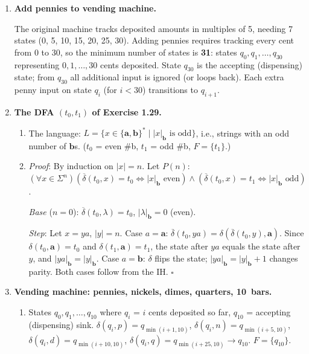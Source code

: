 \documentclass[11pt,openany]{book}
\def\cent{\text{\textcent}}
\def\DBAR{\ensuremath{\overline{\delta}}}
\begin{document}
\begin{enumerate}[{1.}1.]
\item \textbf{Add pennies to vending machine.}

The original machine tracks deposited amounts in multiples of 5\cent, needing 7 states (0, 5, 10, 15, 20, 25, 30\cent).
Adding pennies requires tracking every cent from 0 to 30, so the minimum number of states is \textbf{31}: states $q_0, q_1, \ldots, q_{30}$ representing $0, 1, \ldots, 30$ cents deposited.
State $q_{30}$ is the accepting (dispensing) state; from $q_{30}$ all additional input is ignored (or loops back).
Each extra penny input on state $q_i$ (for $i < 30$) transitions to $q_{i+1}$.

\item \textbf{The DFA $(t_0, t_1)$ of Exercise 1.29.}

\begin{enumerate}
\item The language: $L = \{x\in\{\mathbf{a},\mathbf{b}\}^* \mid |x|_\mathbf{b}\text{ is odd}\}$, i.e., strings with an odd number of $\mathbf{b}$s. ($t_0$ = even \#b, $t_1$ = odd \#b, $F=\{t_1\}$.)

\item \textit{Proof}: By induction on $|x|=n$. Let $P(n)$: $(\forall x\in\Sigma^n)(\DBAR(t_0,x)=t_0\Leftrightarrow|x|_\mathbf{b}\text{ even})\wedge(\DBAR(t_0,x)=t_1\Leftrightarrow|x|_\mathbf{b}\text{ odd})$.

\textit{Base} ($n=0$): $\DBAR(t_0,\lambda)=t_0$, $|\lambda|_\mathbf{b}=0$ (even). \checkmark

\textit{Step}: Let $x=ya$, $|y|=n$. Case $a=\mathbf{a}$: $\DBAR(t_0,ya)=\delta(\DBAR(t_0,y),\mathbf{a})$. Since $\delta(t_0,\mathbf{a})=t_0$ and $\delta(t_1,\mathbf{a})=t_1$, the state after $ya$ equals the state after $y$, and $|ya|_\mathbf{b}=|y|_\mathbf{b}$. Case $a=\mathbf{b}$: $\delta$ flips the state; $|ya|_\mathbf{b}=|y|_\mathbf{b}+1$ changes parity. Both cases follow from the IH. $\square$
\end{enumerate}

\item \textbf{Vending machine: pennies, nickels, dimes, quarters, 10\cent\ bars.}

\begin{enumerate}
\item States $q_0,q_1,\ldots,q_{10}$ where $q_i$ = $i$ cents deposited so far, $q_{10}$ = accepting (dispensing) sink. $\delta(q_i,p)=q_{\min(i+1,10)}$, $\delta(q_i,n)=q_{\min(i+5,10)}$, $\delta(q_i,d)=q_{\min(i+10,10)}$, $\delta(q_i,q)=q_{\min(i+25,10)}\to q_{10}$. $F=\{q_{10}\}$.


\end{enumerate}
\end{enumerate}
\end{document}
